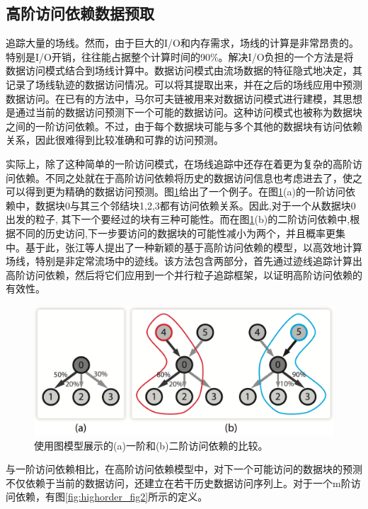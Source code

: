 \subsection{高阶访问依赖数据预取}

追踪大量的场线。然而，由于巨大的I/O和内存需求，场线的计算是非常昂贵的。特别是I/O开销，往往能占据整个计算时间的90\%。解决I/O负担的一个方法是将数据访问模式结合到场线计算中。数据访问模式由流场数据的特征隐式地决定，其记录了场线轨迹的数据访问情况。可以将其提取出来，并在之后的场线应用中预测数据访问。在已有的方法中，马尔可夫链被用来对数据访问模式进行建模，其思想是通过当前的数据访问预测下一个可能的数据访问。这种访问模式也被称为数据块之间的一阶访问依赖。不过，由于每个数据块可能与多个其他的数据块有访问依赖关系，因此很难得到比较准确和可靠的访问预测。

实际上，除了这种简单的一阶访问模式，在场线追踪中还存在着更为复杂的高阶访问依赖。不同之处就在于高阶访问依赖将历史的数据访问信息也考虑进去了，使之可以得到更为精确的数据访问预测。图\ref{fig:highorder_fig1}给出了一个例子。在图\ref{fig:highorder_fig1}(a)的一阶访问依赖中，数据块0与其三个邻结块1,2,3都有访问依赖关系。因此,对于一个从数据块0出发的粒子, 其下一个要经过的块有三种可能性。而在图\ref{fig:highorder_fig1}(b)的二阶访问依赖中,根据不同的历史访问,下一步要访问的数据块的可能性减小为两个，并且概率更集中。基于此，张江等人提出了一种新颖的基于高阶访问依赖的模型，以高效地计算场线，特别是非定常流场中的迹线。该方法包含两部分，首先通过迹线追踪计算出高阶访问依赖，然后将它们应用到一个并行粒子追踪框架，以证明高阶访问依赖的有效性。

\begin{figure}[!tb]
  \centering
  \includegraphics[width=.7\linewidth]{image/prefetch/highorder_fig1.png}
  \caption{
    使用图模型展示的(a)一阶和(b)二阶访问依赖的比较。\parencite{ZhangGY16}
  }
  \label{fig:highorder_fig1}
\end{figure}

与一阶访问依赖相比，在高阶访问依赖模型中，对下一个可能访问的数据块的预测不仅依赖于当前的数据访问，还建立在若干历史数据访问序列上。对于一个m阶访问依赖，有图\ref{fig:highorder_fig2}所示的定义。

